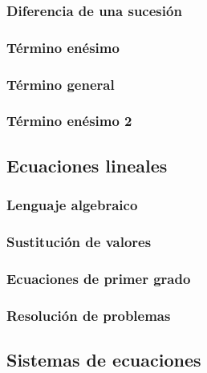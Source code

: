 \documentclass[12pt,repaso,answers]{RDS_unit}
\begin{document}
\begin{questions}
	\subsubsection{Diferencia de una sucesión}
	\question[1]{}
	\subsubsection{Término enésimo}
	\question[1]{}
	\subsubsection{Término general}
	\question[1]{}
	\subsubsection{Término enésimo 2}
	\question[1]{}
	\subsection   {Ecuaciones lineales}
	\subsubsection{Lenguaje algebraico}
	\question[1]{}
	\subsubsection{Sustitución de valores}
	\question[1]{}
	\subsubsection{Ecuaciones de primer grado}
	\question[1]{}
	\subsubsection{Resolución de problemas}
	\question[1]{}
	\subsection   {Sistemas de ecuaciones}

\end{questions}
\end{document}
